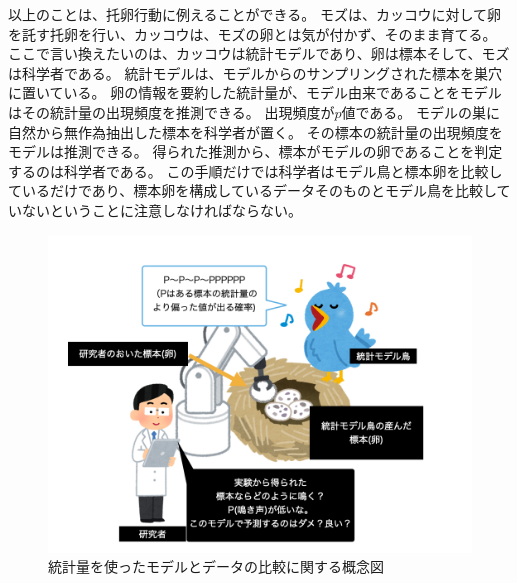 

以上のことは、托卵行動に例えることができる。
モズは、カッコウに対して卵を託す托卵を行い、カッコウは、モズの卵とは気が付かず、そのまま育てる。
ここで言い換えたいのは、カッコウは統計モデルであり、卵は標本そして、モズは科学者である。
統計モデルは、モデルからのサンプリングされた標本を巣穴に置いている。
卵の情報を要約した統計量が、モデル由来であることをモデルはその統計量の出現頻度を推測できる。
出現頻度が$p$値である。
モデルの巣に自然から無作為抽出した標本を科学者が置く。
その標本の統計量の出現頻度をモデルは推測できる。
得られた推測から、標本がモデルの卵であることを判定するのは科学者である。
この手順だけでは科学者はモデル鳥と標本卵を比較しているだけであり、標本卵を構成しているデータそのものとモデル鳥を比較していないということに注意しなければならない。


\begin{figure}
    \begin{center}
        \includegraphics[bb=0 0 1024 768,width=15cm]{./image/01_/conceptual_diagram/conceptual_diagram.003.png}
        \caption{統計量を使ったモデルとデータの比較に関する概念図}
        \label{fig:conceptual_diagram_test}
    \end{center}
\end{figure}
    


